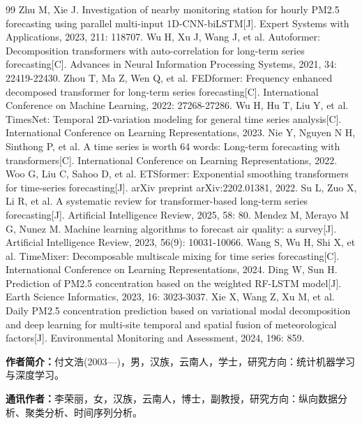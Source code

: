 \documentclass[12pt,a4paper]{article}
\begin{document}
\begin{thebibliography}{99}
 Zhu M, Xie J. Investigation of nearby monitoring station for hourly PM2.5 forecasting using parallel multi-input 1D-CNN-biLSTM[J]. Expert Systems with Applications, 2023, 211: 118707.
 Wu H, Xu J, Wang J, et al. Autoformer: Decomposition transformers with auto-correlation for long-term series forecasting[C]. Advances in Neural Information Processing Systems, 2021, 34: 22419-22430.
 Zhou T, Ma Z, Wen Q, et al. FEDformer: Frequency enhanced decomposed transformer for long-term series forecasting[C]. International Conference on Machine Learning, 2022: 27268-27286.
 Wu H, Hu T, Liu Y, et al. TimesNet: Temporal 2D-variation modeling for general time series analysis[C]. International Conference on Learning Representations, 2023.
 Nie Y, Nguyen N H, Sinthong P, et al. A time series is worth 64 words: Long-term forecasting with transformers[C]. International Conference on Learning Representations, 2022.
 Woo G, Liu C, Sahoo D, et al. ETSformer: Exponential smoothing transformers for time-series forecasting[J]. arXiv preprint arXiv:2202.01381, 2022.
 Su L, Zuo X, Li R, et al. A systematic review for transformer-based long-term series forecasting[J]. Artificial Intelligence Review, 2025, 58: 80.
 Mendez M, Merayo M G, Nunez M. Machine learning algorithms to forecast air quality: a survey[J]. Artificial Intelligence Review, 2023, 56(9): 10031-10066.
 Wang S, Wu H, Shi X, et al. TimeMixer: Decomposable multiscale mixing for time series forecasting[C]. International Conference on Learning Representations, 2024.
 Ding W, Sun H. Prediction of PM2.5 concentration based on the weighted RF-LSTM model[J]. Earth Science Informatics, 2023, 16: 3023-3037.
 Xie X, Wang Z, Xu M, et al. Daily PM2.5 concentration prediction based on variational modal decomposition and deep learning for multi-site temporal and spatial fusion of meteorological factors[J]. Environmental Monitoring and Assessment, 2024, 196: 859.
\end{thebibliography}

\noindent\textbf{作者简介：}付文浩(2003—)，男，汉族，云南人，学士，研究方向：统计机器学习与深度学习。

\noindent\textbf{通讯作者：}李荣丽，女，汉族，云南人，博士，副教授，研究方向：纵向数据分析、聚类分析、时间序列分析。
\end{document}
